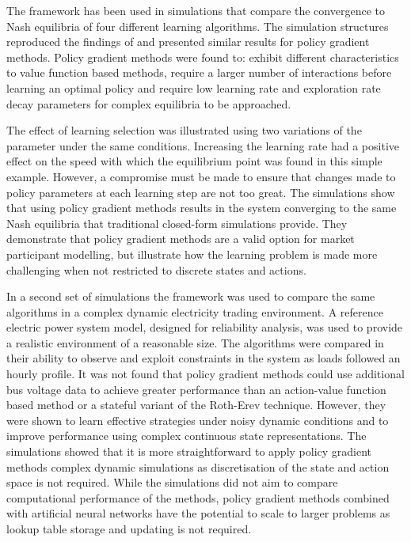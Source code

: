 The framework has been used in simulations that compare the convergence to Nash
equilibria of four different learning algorithms.  The simulation structures
reproduced the findings of  and presented similar results
for policy gradient methods.  Policy gradient methods were found to: exhibit
different characteristics to value function based methods, require a larger
number of interactions before learning an optimal policy and require low
learning rate and exploration rate decay parameters for complex equilibria to be
approached.

The effect of learning selection was illustrated using two
variations of the parameter under the same conditions. Increasing the learning
rate had a positive effect on the speed with which the equilibrium point was
found in this simple example.  However, a compromise must be made to ensure
that changes made to policy parameters at each learning step are not too great.
 The simulations show that using policy gradient methods results in the system
converging to the same Nash equilibria that traditional closed-form simulations
provide.  They demonstrate that policy gradient methods are a valid option for
market participant modelling, but illustrate how the learning problem is made
more challenging when not restricted to discrete states and actions.

In a second set of simulations the framework was used to compare the same
algorithms in a complex dynamic electricity trading environment.  A reference
electric power system model, designed for reliability analysis, was used to
provide a realistic environment of a reasonable size.  The algorithms were
compared in their ability to observe and exploit constraints in the system as
loads followed an hourly profile.  It was not found that policy gradient methods
could use additional bus voltage data to achieve greater performance than an
action-value function based method or a stateful variant of the Roth-Erev
technique. However, they were shown to learn effective strategies under noisy
dynamic conditions and to improve performance using complex continuous state
representations. The simulations showed that it is more straightforward to apply
policy gradient methods complex dynamic simulations as discretisation of the
state and action space is not required. While the simulations did not aim to
compare computational performance of the methods, policy gradient methods
combined with artificial neural networks have the potential to scale to larger
problems as lookup table storage and updating is not required.

